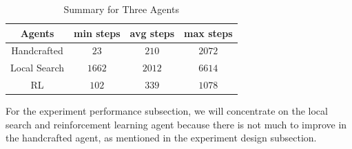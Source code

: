 \documentclass[letterpaper]{article} %
\begin{document}
\begin{table}[h!]
  \centering
  \normalsize{
    \begin{tabular}{ cccc } 
      \hline
      Agents & min steps & avg steps & max steps  \\ 
      \hline
      \hline
      Handcrafted & $23$ & $210$ & $2072$ \\ 
      Local Search & $1662$ & $2012$ & $6614$\\ 
      RL & $102$ & $339$ & $1078$\\
       \hline
      \end{tabular}}
  \caption{Summary for Three Agents}
  \label{tab:resultsSummary}
\end{table} 

For the experiment performance subsection, we will concentrate on the local search and reinforcement learning agent because there is not much to improve in the handcrafted agent, as mentioned in the experiment design subsection. 
\end{document}

